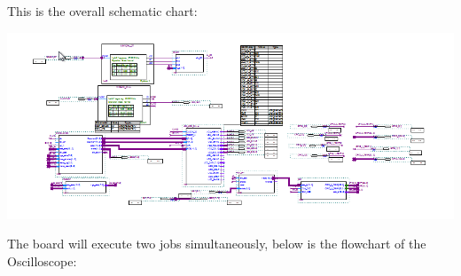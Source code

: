 \documentclass[11pt]{scrartcl}
\begin{document}
This is the overall schematic chart:
\begin{center}
\begin{minipage}[t]{\linewidth}

{
\includegraphics[scale = 0.5]{schematic.png}
}
\end{minipage}
\medskip
\end{center}

The board will execute two jobs simultaneously, below is the flowchart of the Oscilloscope:
\end{document}
